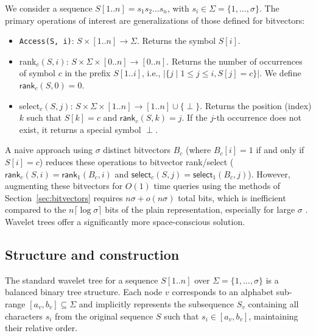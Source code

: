We consider a sequence $S[1..n] = s_1s_2\dots s_n$, with $s_i \in \Sigma = \{1, \dots, \sigma\}$. The primary operations of interest are generalizations of those defined for bitvectors:
\begin{itemize}
    \item \texttt{Access(S, i)}: $S \times [1..n] \to \Sigma$. Returns the symbol $S[i]$.
    \item \textsf{rank}$_c(S, i)$: $S \times \Sigma \times [0..n] \to [0..n]$. Returns the number of occurrences of symbol $c$ in the prefix $S[1..i]$, i.e., $|\{j \mid 1 \le j \le i, S[j]=c\}|$. We define $\textsf{rank}_c(S, 0) = 0$.
    \item \textsf{select}$_c(S, j)$: $S \times \Sigma \times [1..n] \to [1..n] \cup \{\perp\}$. Returns the position (index) $k$ such that $S[k]=c$ and $\textsf{rank}_c(S, k) = j$. If the $j$-th occurrence does not exist, it returns a special symbol $\perp$.
\end{itemize}
A naive approach using $\sigma$ distinct bitvectors $B_c$ (where $B_c[i]=1$ if and only if $S[i]=c$) reduces these operations to bitvector rank/select ($\textsf{rank}_c(S,i) = \textsf{rank}_1(B_c,i)$ and $\textsf{select}_c(S,j) = \textsf{select}_1(B_c,j)$). However, augmenting these bitvectors for $O(1)$ time queries using the methods of Section~\ref{sec:bitvectors} requires $n\sigma + o(n\sigma)$ total bits, which is inefficient compared to the $n \lceil \log \sigma \rceil$ bits of the plain representation, especially for large $\sigma$ \cite{navarro2016compact}. Wavelet trees offer a significantly more space-conscious solution.

\subsection{Structure and construction}

The standard wavelet tree for a sequence $S[1..n]$ over $\Sigma = \{1, \dots, \sigma\}$ is a balanced binary tree structure. Each node $v$ corresponds to an alphabet sub-range $[a_v, b_v] \subseteq \Sigma$ and implicitly represents the subsequence $S_v$ containing all characters $s_i$ from the original sequence $S$ such that $s_i \in [a_v, b_v]$, maintaining their relative order.

